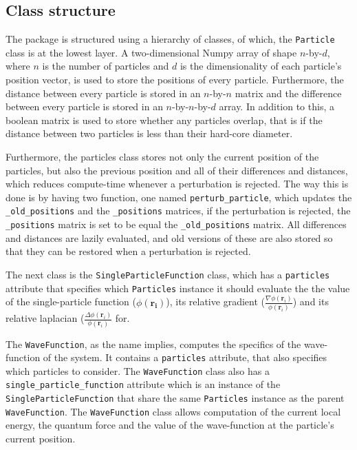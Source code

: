 \documentclass[11pt,a4paper]{article}
\numberwithin{equation}{section}
\begin{document}
\subsection{Class structure}
The package is structured using a hierarchy of classes, of which, the \texttt{Particle} class is at the lowest layer. A two-dimensional Numpy array of shape $n$-by-$d$, where $n$ is the number of particles and $d$ is the dimensionality of each particle's position vector, is used to store the positions of every particle. Furthermore, the distance between every particle is stored in an $n$-by-$n$ matrix and the difference between every particle is stored in an $n$-by-$n$-by-$d$ array. In addition to this, a boolean matrix is used to store whether any particles overlap, that is if the distance between two particles is less than their hard-core diameter. 

Furthermore, the particles class stores not only the current position of the particles, but also the previous position and all of their differences and distances, which reduces compute-time whenever a perturbation is rejected. The way this is done is by having two function, one named \texttt{perturb\_particle}, which updates the \texttt{\_old\_positions} and the \texttt{\_positions} matrices, if the perturbation is rejected, the \texttt{\_positions} matrix is set to be equal the \texttt{\_old\_positions} matrix. All differences and distances are lazily evaluated, and old versions of these are also stored so that they can be restored when a perturbation is rejected.

The next class is the \texttt{SingleParticleFunction} class, which has a \texttt{particles} attribute that specifies which \texttt{Particles} instance it should evaluate the the value of the single-particle function ($\phi(\bm{r_i})$), its relative gradient ($\frac{\nabla \phi(\bm{r}_i)}{\phi(\bm{r}_i)}$) and its relative laplacian ($\frac{\Delta \phi(\bm{r}_i)}{\phi(\bm{r}_i)}$ for.

The \texttt{WaveFunction}, as the name implies, computes the specifics of the wave-function of the system. It contains a \texttt{particles} attribute, that also specifies which particles to consider. The \texttt{WaveFunction} class also has a \texttt{single\_particle\_function} attribute which is an instance of the \texttt{SingleParticleFunction} that share the same \texttt{Particles} instance as the parent \texttt{WaveFunction}. The \texttt{WaveFunction} class allows computation of the current local energy, the quantum force and the value of the wave-function at the particle's current position.
\end{document}
